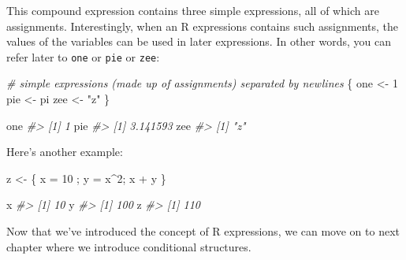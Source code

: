 \documentclass[
]{book}
\newenvironment{Shaded}{\begin{snugshade}}{\end{snugshade}}
\newcommand{\CommentTok}[1]{\textcolor[rgb]{0.56,0.35,0.01}{\textit{#1}}}
\newcommand{\DecValTok}[1]{\textcolor[rgb]{0.00,0.00,0.81}{#1}}
\newcommand{\NormalTok}[1]{#1}
\newcommand{\OtherTok}[1]{\textcolor[rgb]{0.56,0.35,0.01}{#1}}
\newcommand{\SpecialCharTok}[1]{\textcolor[rgb]{0.00,0.00,0.00}{#1}}
\newcommand{\StringTok}[1]{\textcolor[rgb]{0.31,0.60,0.02}{#1}}
\begin{document}
This compound expression contains three simple expressions, all of which are
assignments. Interestingly, when an R expressions contains such assignments, the
values of the variables can be used in later expressions. In other words, you
can refer later to \texttt{one} or \texttt{pie} or \texttt{zee}:

\begin{Shaded}
\begin{Highlighting}[]
\CommentTok{\# simple expressions (made up of assignments) separated by newlines}
\NormalTok{\{}
\NormalTok{  one }\OtherTok{\textless{}{-}} \DecValTok{1}
\NormalTok{  pie }\OtherTok{\textless{}{-}}\NormalTok{ pi}
\NormalTok{  zee }\OtherTok{\textless{}{-}} \StringTok{"z"}
\NormalTok{\}}

\NormalTok{one}
\CommentTok{\#\textgreater{} [1] 1}
\NormalTok{pie}
\CommentTok{\#\textgreater{} [1] 3.141593}
\NormalTok{zee}
\CommentTok{\#\textgreater{} [1] "z"}
\end{Highlighting}
\end{Shaded}

Here's another example:

\begin{Shaded}
\begin{Highlighting}[]
\NormalTok{z }\OtherTok{\textless{}{-}}\NormalTok{ \{ x }\OtherTok{=} \DecValTok{10}\NormalTok{ ; y }\OtherTok{=}\NormalTok{ x}\SpecialCharTok{\^{}}\DecValTok{2}\NormalTok{; x }\SpecialCharTok{+}\NormalTok{ y \}}

\NormalTok{x}
\CommentTok{\#\textgreater{} [1] 10}
\NormalTok{y}
\CommentTok{\#\textgreater{} [1] 100}
\NormalTok{z}
\CommentTok{\#\textgreater{} [1] 110}
\end{Highlighting}
\end{Shaded}

Now that we've introduced the concept of R expressions, we can move on to next
chapter where we introduce conditional structures.

  
\end{document}
